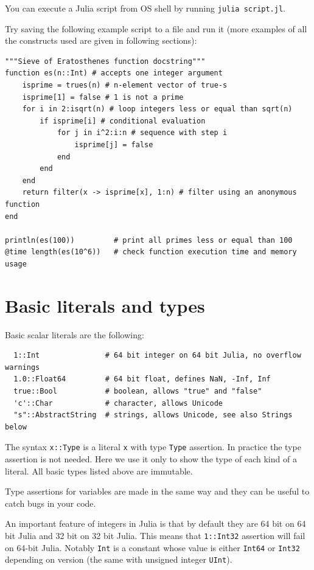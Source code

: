 \documentclass[10pt,a4paper]{article}
\begin{document}
You can execute a Julia script from OS shell by running \lstinline|julia script.jl|.

Try saving the following example script to a file and run it (more examples of
all the constructs used are given in following sections):
\begin{lstlisting}
"""Sieve of Eratosthenes function docstring"""
function es(n::Int) # accepts one integer argument
    isprime = trues(n) # n-element vector of true-s
    isprime[1] = false # 1 is not a prime
    for i in 2:isqrt(n) # loop integers less or equal than sqrt(n)
        if isprime[i] # conditional evaluation
            for j in i^2:i:n # sequence with step i
                isprime[j] = false
            end
        end
    end
    return filter(x -> isprime[x], 1:n) # filter using an anonymous function
end

println(es(100))         # print all primes less or equal than 100
@time length(es(10^6))   # check function execution time and memory usage
\end{lstlisting}

\section{Basic literals and types}
Basic scalar literals are the following:
\begin{lstlisting}
  1::Int               # 64 bit integer on 64 bit Julia, no overflow warnings
  1.0::Float64         # 64 bit float, defines NaN, -Inf, Inf
  true::Bool           # boolean, allows "true" and "false"
  'c'::Char            # character, allows Unicode
  "s"::AbstractString  # strings, allows Unicode, see also Strings below
\end{lstlisting}
The syntax \lstinline|x::Type| is a literal \lstinline|x| with type
\lstinline|Type| assertion. In practice the type assertion is not needed. Here
we use it only to show the type of each kind of a literal. All basic types
listed above are immutable.

Type assertions for variables are made in the same way and they can be useful to
catch bugs in your code.

An important feature of integers in Julia is that by default they are 64 bit on
64 bit Julia and 32 bit on 32 bit Julia. This means that \lstinline|1::Int32|
assertion will fail on 64-bit Julia. Notably \lstinline|Int| is a constant whose
value is either \lstinline|Int64| or \lstinline|Int32| depending on version (the
same with unsigned integer \lstinline|UInt|).
\end{document}

